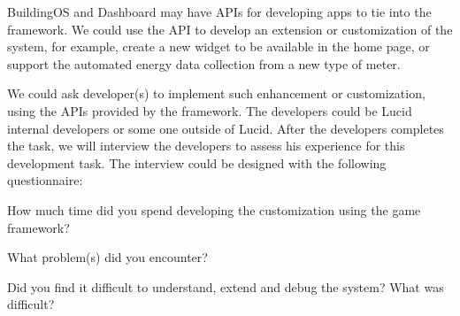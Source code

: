 \documentclass[11pt]{article}
\begin{document}
BuildingOS and Dashboard may have APIs for developing apps to tie into the framework. We could use the API to develop an extension or customization of the system, for example, create a new widget to be available in the home page, or support the automated energy data collection from a new type of meter.

We could ask developer(s) to implement such enhancement or customization, using the APIs provided by the framework. The developers could be Lucid internal developers or some one outside of Lucid. After the developers completes the task, we will interview the developers to assess his experience for this development task. The interview could be designed with the following questionnaire:

\begin{compactitem}
\item How much time did you spend developing the customization using the game framework?
\item What problem(s) did you encounter?
\item Did you find it difficult to understand, extend and debug the system? What was difficult?\\
\end{compactitem}    
    


\end{document}
